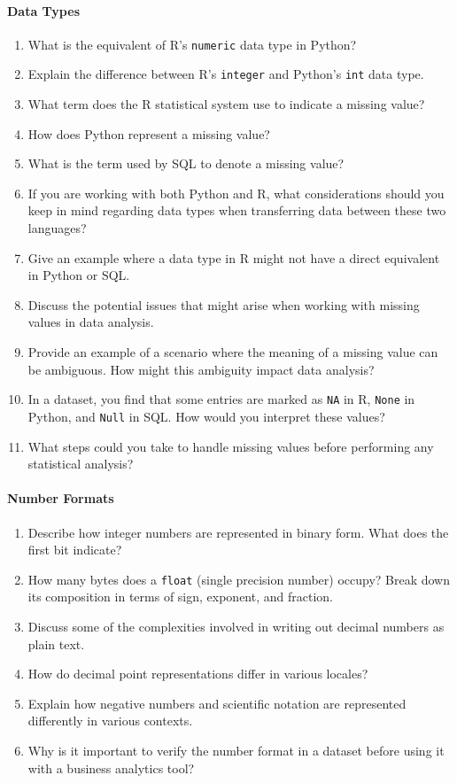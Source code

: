 \paragraph*{Data Types}
\begin{enumerate}[nosep]
	\item What is the equivalent of R's \texttt{numeric} data type in Python?
	\item Explain the difference between R's \texttt{integer} and Python's \texttt{int} data type.
	\item What term does the R statistical system use to indicate a missing value?
	\item How does Python represent a missing value?
	\item What is the term used by SQL to denote a missing value?
	\item If you are working with both Python and R, what considerations should you keep in mind regarding data types when transferring data between these two languages?
	\item Give an example where a data type in R might not have a direct equivalent in Python or SQL.
	\item Discuss the potential issues that might arise when working with missing values in data analysis.
	\item Provide an example of a scenario where the meaning of a missing value can be ambiguous. How might this ambiguity impact data analysis?
	\item In a dataset, you find that some entries are marked as \texttt{NA} in R, \texttt{None} in Python, and \texttt{Null} in SQL. How would you interpret these values?
	\item What steps could you take to handle missing values before performing any statistical analysis?
\end{enumerate}
\paragraph*{Number Formats}
\begin{enumerate}
	\item Describe how integer numbers are represented in binary form. What does the first bit indicate?
	\item How many bytes does a \texttt{float} (single precision number) occupy? Break down its composition in terms of sign, exponent, and fraction.
	\item Discuss some of the complexities involved in writing out decimal numbers as plain text.
	\item How do decimal point representations differ in various locales?
	\item Explain how negative numbers and scientific notation are represented differently in various contexts.
	\item Why is it important to verify the number format in a dataset before using it with a business analytics tool?
\end{enumerate}
